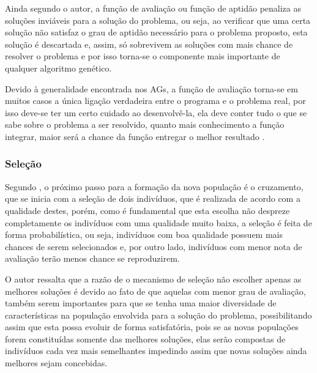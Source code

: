 \par Ainda segundo o autor, a função de avaliação ou função de aptidão penaliza
as soluções inviáveis para a solução do problema, ou seja, ao verificar que uma
certa solução não satisfaz o grau de aptidão necessário para o problema
proposto, esta solução é descartada e, assim, só sobrevivem as soluções com mais
chance de resolver o problema e por isso torna-se o componente mais importante de qualquer algoritmo genético.

\par Devido à generalidade encontrada nos AGs, a função de avaliação
torna-se em muitos casos a única ligação verdadeira entre o programa e o problema real, por
isso deve-se ter um certo cuidado ao desenvolvê-la, ela deve conter tudo o que
se sabe sobre o problema a ser resolvido, quanto mais conhecimento a função
integrar, maior será a chance da função entregar o melhor resultado
\cite{livro_ags_ricardo_linden}.



\subsubsection{Seleção}

\par Segundo , o próximo passo
para a formação da nova população é o cruzamento, que se inicia com a seleção de
dois indivíduos, que é realizada de acordo com a qualidade destes, porém,
como é fundamental que esta escolha não despreze completamente os indivíduos com uma
qualidade muito baixa, a seleção é feita de forma probabilística, ou seja,
indivíduos com boa qualidade possuem mais chances de serem selecionados e, por
outro lado, indivíduos com menor nota de avaliação terão menos chance se
reproduzirem.

\par O autor ressalta que a razão de o mecanismo de seleção não
escolher apenas as melhores soluções é devido ao fato de que aquelas com menor
grau de avaliação, também serem importantes para que se tenha uma maior diversidade de características
na população envolvida para a solução do problema, possibilitando assim
que esta possa evoluir de forma satisfatória, pois se as novas populações forem constituídas
somente das melhores soluções, elas serão compostas de indivíduos cada vez mais semelhantes
impedindo assim que novas soluções ainda melhores sejam concebidas.

